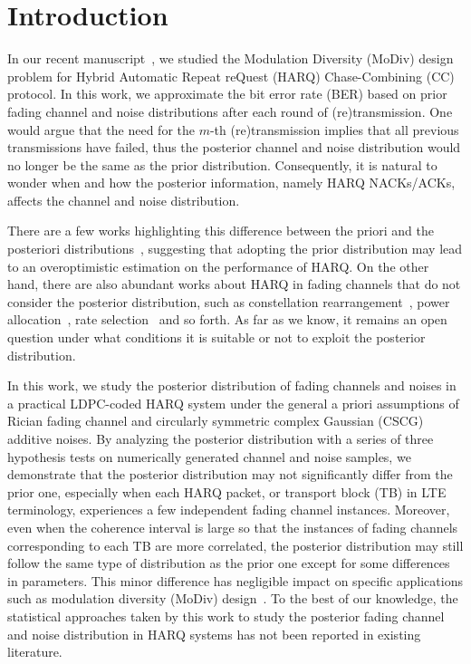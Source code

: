 \documentclass[journal,draftcls,onecolumn,12pt,twoside]{IEEEtran}
\begin{document}
\section{Introduction}
\label{sec:intro}
In our recent manuscript~\cite{wu2015modulation}, we studied the Modulation
Diversity (MoDiv) design problem for Hybrid Automatic Repeat reQuest (HARQ)
Chase-Combining (CC) protocol. In this work, we approximate the bit
error rate (BER) based on prior fading channel and noise distributions after
each round of (re)transmission. One would argue that the need for the
$m$-th (re)transmission implies that all previous transmissions have failed,
thus the posterior channel and noise distribution would no longer be the same as
the prior distribution. Consequently, it is natural to wonder when and how the
posterior information, namely HARQ NACKs/ACKs, affects the channel and noise
distribution.

There are a few works highlighting this difference between the priori and
the posteriori
distributions~\cite{gu2006modeling}\cite{long2012analysis}\cite{alkurd2015modeling},
suggesting that adopting the prior distribution may lead to an overoptimistic
estimation on the performance of HARQ.
On the other hand, there are also abundant works about HARQ in fading channels
that do not consider the posterior distribution, such as constellation
rearrangement~\cite{harvind2005symbol}, power
allocation~\cite{chaitanya2014adaptive}, rate selection~\cite{jin2011optimal}
and so forth. As far as we know, it remains an open question
under what conditions it is suitable or not to exploit the posterior distribution.

In this work, we study the posterior distribution of fading channels and noises
in a practical LDPC-coded HARQ system under the general a priori assumptions of
Rician fading channel and circularly symmetric complex Gaussian (CSCG)
additive noises. By analyzing the posterior distribution with a series of three
hypothesis tests on numerically generated channel and noise samples, we
demonstrate that the posterior distribution may not significantly differ from
the prior one, especially when each HARQ packet, or transport block (TB) in LTE
terminology, experiences a few independent fading channel instances. 
Moreover, even when the coherence interval is large so that the instances of
fading channels corresponding to each TB are more correlated, the posterior
distribution may still follow the same type of distribution as the prior one
except for some differences in parameters. This minor difference has negligible
impact on specific applications such as modulation diversity (MoDiv)
design~\cite{}. To the best of our knowledge, the statistical approaches taken
by this work to study the posterior fading channel and noise
distribution in HARQ systems has not been reported in existing literature.
\end{document}
